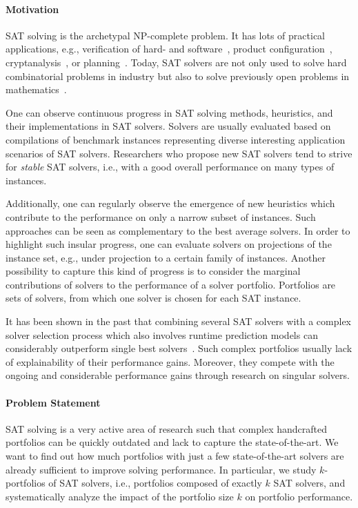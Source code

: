 \documentclass[conference]{IEEEtran}
\begin{document}
\paragraph{Motivation}

SAT solving is the archetypal NP-complete problem.
It has lots of practical applications, e.g., verification of hard- and software~\cite{Kaufmann:2021:Amulet,Buning:2020:QPRVerify}, product configuration~\cite{Janota:2014:Configuration}, cryptanalysis~\cite{Nejati:2020:CDCLCrypto}, or planning~\cite{Schreiber:2021:Lilotane}.
Today, SAT solvers are not only used to solve hard combinatorial problems in industry but also to solve previously open problems in mathematics~\cite{Heule:2016:Pyth,Heule:2018:Schur}. 

One can observe continuous progress in SAT solving methods, heuristics, and their implementations in SAT solvers. 
Solvers are usually evaluated based on compilations of benchmark instances representing diverse interesting application scenarios of SAT solvers. 
Researchers who propose new SAT solvers tend to strive for \emph{stable} SAT solvers, i.e., with a good overall performance on many types of instances. 

Additionally, one can regularly observe the emergence of new heuristics which contribute to the performance on only a narrow subset of instances. 
Such approaches can be seen as complementary to the best average solvers.
In order to highlight such insular progress, one can evaluate solvers on projections of the instance set, e.g., under projection to a certain family of instances.
Another possibility to capture this kind of progress is to consider the marginal contributions of solvers to the performance of a solver portfolio.
Portfolios are sets of solvers, from which one solver is chosen for each SAT instance.

It has been shown in the past that combining several SAT solvers with a complex solver selection process which also involves runtime prediction models can considerably outperform single best solvers~\cite{xu2008satzilla}.
Such complex portfolios usually lack of explainability of their performance gains. 
Moreover, they compete with the ongoing and considerable performance gains through research on singular solvers. 

\paragraph{Problem Statement}

SAT solving is a very active area of research such that complex handcrafted portfolios can be quickly outdated and lack to capture the state-of-the-art. 
We want to find out how much portfolios with just a few state-of-the-art solvers are already sufficient to improve solving performance. 
In particular, we study $k$-portfolios of SAT solvers, i.e., portfolios composed of exactly $k$ SAT solvers, and systematically analyze the impact of the portfolio size $k$ on portfolio performance. 
\end{document}
